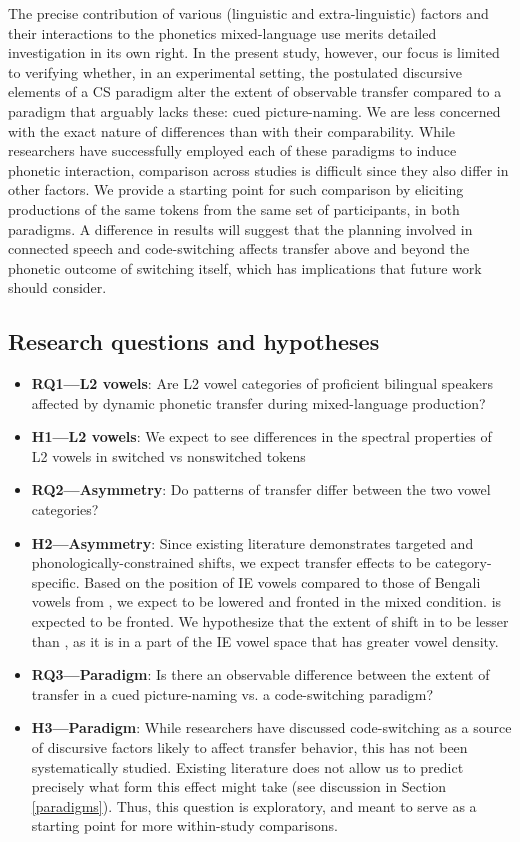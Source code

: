 \documentclass[12 pt]{article}
\newcommand{\nt}[1]{\textipa{[#1]}} %
\begin{document}
The precise contribution of various (linguistic and extra-linguistic) factors and their interactions to the phonetics mixed-language use merits detailed investigation in its own right. In the present study, however, our focus is limited to verifying whether, in an experimental setting, the postulated discursive elements of a CS paradigm alter the extent of observable transfer compared to a paradigm that arguably lacks these: cued picture-naming. We are less concerned with the exact nature of differences than with their comparability. While researchers have successfully employed each of these paradigms to induce phonetic interaction, comparison across studies is difficult since they also differ in other factors. We provide a starting point for such comparison by eliciting productions of the same tokens from the same set of participants, in both paradigms. A difference in results will suggest that the planning involved in connected speech and code-switching affects transfer above and beyond the phonetic outcome of switching itself, which has implications that future work should consider. 


\subsection*{Research questions and hypotheses}\label{questions_and_hypotheses}
\begin{itemize}
	\item \textbf{RQ1---L2 vowels}: Are L2 vowel categories of proficient bilingual speakers affected by dynamic phonetic transfer during mixed-language production?
	\item \textbf{H1---L2 vowels}: We expect to see differences in the spectral properties of L2 vowels in switched vs nonswitched tokens
	\item \textbf{RQ2---Asymmetry}: Do patterns of transfer differ between the two vowel categories?
	\item \textbf{H2---Asymmetry}: Since existing literature demonstrates targeted and phonologically-constrained shifts, we expect transfer effects to be category-specific. Based on the position of IE vowels compared to those of Bengali vowels from \cite{shruticorpus}, we expect \nt{2} to be lowered and fronted in the mixed condition. \nt{\ae} is expected to be fronted. We hypothesize that the extent of shift in \nt{\ae} to be lesser than \nt{2}, as it is in a part of the IE vowel space that has greater vowel density.
	\item \textbf{RQ3---Paradigm}: Is there an observable difference between the extent of transfer in a cued picture-naming vs. a code-switching paradigm? 
	\item \textbf{H3---Paradigm}: While researchers have discussed code-switching as a source of discursive factors likely to affect transfer behavior, this has not been systematically studied. Existing literature does not allow us to predict precisely what form this effect might take (see discussion in Section \ref{paradigms}). Thus, this question is exploratory, and meant to serve as a starting point for more within-study comparisons. 
\end{itemize}
\end{document}
